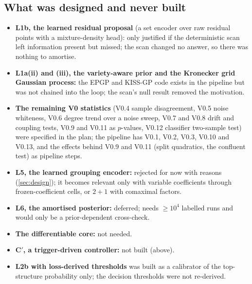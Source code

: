 \subsection{What was designed and never built}\label{sec:unbuilt}
\begin{itemize}
\item \textbf{L1b, the learned residual proposal} (a set encoder over raw residual points with a mixture-density head): only justified if the deterministic scan left information present but missed; the scan changed no answer, so there was nothing to amortise.
\item \textbf{L1a(ii) and (iii), the variety-aware prior and the Kronecker grid Gaussian process:} the EPGP and KISS-GP code exists in the pipeline but was not chained into the loop; the scan's null result removed the motivation.
\item \textbf{The remaining V0 statistics} (V0.4 sample disagreement, V0.5 noise whiteness, V0.6 degree trend over a noise sweep, V0.7 and V0.8 drift and coupling tests, V0.9 and V0.11 as $p$-values, V0.12 classifier two-sample test) were specified in the plan; the pipeline has V0.1, V0.2, V0.3, V0.10 and V0.13, and the effects behind V0.9 and V0.11 (split quadratics, the confluent test) as pipeline steps.
\item \textbf{L5, the learned grouping encoder:} rejected for now with reasons (\cref{sec:design}); it becomes relevant only with variable coefficients through frozen-coefficient cells, or $2{+}1$ with comaximal factors.
\item \textbf{L6, the amortised posterior:} deferred; needs $\ge10^4$ labelled runs and would only be a prior-dependent cross-check.
\item \textbf{The differentiable core:} not needed.
\item \textbf{C$'$, a trigger-driven controller:} not built (above).
\item \textbf{L2b with loss-derived thresholds} was built as a calibrator of the top-structure probability only; the decision thresholds were not re-derived.
\end{itemize}

